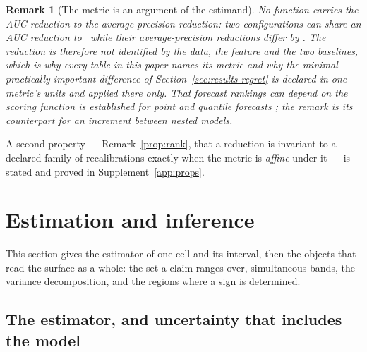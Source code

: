 \documentclass[11pt,3p,review,authoryear]{elsarticle}
\newtheorem{remark}{Remark}
\theoremstyle{definition}
\begin{document}
\begin{remark}[The metric is an argument of the estimand]
\label{prop:nonid}
No function carries the AUC reduction to the average-precision reduction: two
configurations can share an AUC reduction to \propOneAucGap\ while their
average-precision reductions differ by \propOneApGap. The reduction is
therefore not identified by the data, the feature and the two baselines, which
is why every table in this paper names its metric and why the minimal
practically important difference of Section~\ref{sec:results-regret} is
declared in one metric's units and applied there only. That forecast rankings
can depend on the scoring function is established for point and quantile
forecasts \citep{ehm2016quantiles,patton2020comparing}; the remark is its
counterpart for an increment between nested models.
\end{remark}

\noindent A second property --- Remark~\ref{prop:rank}, that a reduction is
invariant to a declared family of recalibrations exactly when the metric is
\emph{affine} under it --- is stated and proved in
Supplement~\ref{app:props}.
\section{Estimation and inference}
\label{sec:inference}

This section gives the estimator of one cell and its interval, then the
objects that read the surface as a whole: the set a claim ranges over,
simultaneous bands, the variance decomposition, and the regions where a sign
is determined.

\subsection{The estimator, and uncertainty that includes the model}
\label{sec:boot}
\end{document}
